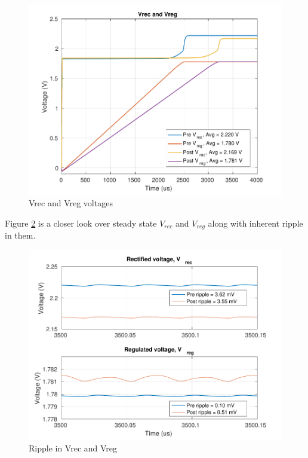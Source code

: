 \documentclass[UKenglish]{ifimaster}  %
\begin{document}
\begin{figure} [H]
  \centering
  \includegraphics[width=\textwidth]{img/wpt/wpt_Vout_both.pdf} 
 \caption{Vrec and Vreg voltages} 
\label{fig:wpt_vout} 
\end{figure}

Figure \ref{fig:wpt_ripple} is a closer look over steady state $V_{rec}$ and $V_{reg}$ along with inherent ripple in them. 
\\

\begin{figure} [H]
  \centering
  \includegraphics[width=\textwidth]{img/wpt/wpt_ripple_both.pdf} 
 \caption{Ripple in Vrec and Vreg} 
\label{fig:wpt_ripple} 
\end{figure}
\end{document}
